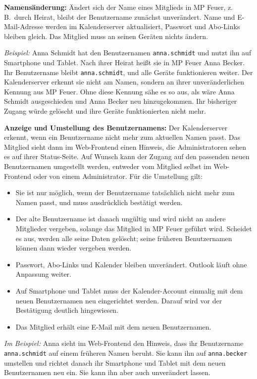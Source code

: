 \documentclass[a4paper,fontsize=10pt]{scrartcl}
\begin{document}
\textbf{Namensänderung:} Ändert sich der Name eines Mitglieds in MP Feuer,
z.\,B.\ durch Heirat, bleibt der Benutzername zunächst unverändert. Name und
E-Mail-Adresse werden im Kalenderserver aktualisiert, Passwort und Abo-Links
bleiben gleich. Das Mitglied muss an seinen Geräten nichts ändern.

\emph{Beispiel:} Anna Schmidt hat den Benutzernamen \texttt{anna.schmidt} und
nutzt ihn auf Smartphone und Tablet. Nach ihrer Heirat heißt sie in MP Feuer
Anna Becker. Ihr Benutzername bleibt \texttt{anna.schmidt}, und alle Geräte
funktionieren weiter. Der Kalenderserver erkennt sie nicht am Namen, sondern
an ihrer unveränderlichen Kennung aus MP Feuer. Ohne diese Kennung sähe es
so aus, als wäre Anna Schmidt ausgeschieden und Anna Becker neu
hinzugekommen. Ihr bisheriger Zugang würde gelöscht und ihre Geräte
funktionierten nicht mehr.

\textbf{Anzeige und Umstellung des Benutzernamens:} Der Kalenderserver
erkennt, wenn ein Benutzername nicht mehr zum aktuellen Namen passt. Das
Mitglied sieht dann im Web-Frontend einen Hinweis, die Administratoren sehen
es auf ihrer Status-Seite. Auf Wunsch kann der Zugang auf den passenden neuen
Benutzernamen umgestellt werden, entweder vom Mitglied selbst im
Web-Frontend oder von einem Administrator. Für die Umstellung gilt:

\begin{itemize}
  \item Sie ist nur möglich, wenn der Benutzername tatsächlich nicht mehr
        zum Namen passt, und muss ausdrücklich bestätigt werden.
  \item Der alte Benutzername ist danach ungültig und wird nicht an andere
        Mitglieder vergeben, solange das Mitglied in MP Feuer geführt wird.
        Scheidet es aus, werden alle seine Daten gelöscht; seine früheren
        Benutzernamen können dann wieder vergeben werden.
  \item Passwort, Abo-Links und Kalender bleiben unverändert. Outlook läuft
        ohne Anpassung weiter.
  \item Auf Smartphone und Tablet muss der Kalender-Account einmalig mit dem
        neuen Benutzernamen neu eingerichtet werden. Darauf wird vor der
        Bestätigung deutlich hingewiesen.
  \item Das Mitglied erhält eine E-Mail mit dem neuen Benutzernamen.
\end{itemize}

\emph{Im Beispiel:} Anna sieht im Web-Frontend den Hinweis, dass ihr
Benutzername \texttt{anna.schmidt} auf einem früheren Namen beruht. Sie kann
ihn auf \texttt{anna.becker} umstellen und richtet danach ihr Smartphone und
Tablet mit dem neuen Benutzernamen neu ein. Sie kann ihn aber auch
unverändert lassen.
\end{document}
